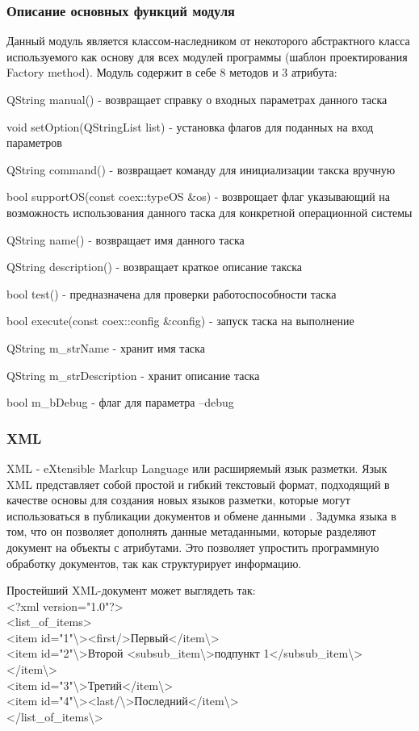 \subsubsection{Описание основных функций модуля}

Данный модуль является классом-наследником от некоторого абстрактного класса используемого как основу для всех модулей программы (шаблон проектирования Factory method). Модуль содержит в себе 8 методов и 3 атрибута:

QString manual() - возвращает справку о входных параметрах данного таска

void setOption(QStringList list) - установка флагов для поданных на вход параметров

QString command() - возвращает команду для инициализации такска вручную

bool supportOS(const coex::typeOS &os) - возврощает флаг указывающий на возможность использования данного таска для конкретной операционной системы

QString name() - возвращает имя данного таска

QString description() - возвращает краткое описание такска

bool test() - предназначена для проверки работоспособности таска

bool execute(const coex::config &config) - запуск таска на выполнение

QString m\_strName - хранит имя таска

QString m\_strDescription - хранит описание таска

bool m\_bDebug - флаг для параметра –debug

\subsubsection{XML}

XML - eXtensible Markup Language или расширяемый язык разметки. Язык XML представляет собой простой и гибкий текстовый формат, подходящий в качестве основы для создания новых языков разметки, которые могут использоваться в публикации документов и обмене данными \cite{xml}. Задумка языка в том, что он позволяет дополнять данные метаданными, которые разделяют документ на объекты с атрибутами. Это позволяет упростить программную обработку документов, так как структурирует информацию.

Простейший XML-документ может выглядеть так:
\\
<?xml version="1.0"?> \\
<list\_of\_items> \\
<item id="1"\textbackslash><first/>Первый</item\textbackslash> \\
<item id="2"\textbackslash>Второй <subsub\_item\textbackslash>подпункт 1</subsub\_item\textbackslash></item\textbackslash> \\
<item id="3"\textbackslash>Третий</item\textbackslash> \\
<item id="4"\textbackslash><last/\textbackslash>Последний</item\textbackslash> \\
</list\_of\_items\textbackslash>


